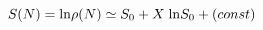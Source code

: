 \begin{equation}\label{s}
S(N) = {\rm ln} \rho(N) 
\simeq S_0 + X \; {\rm ln} S_0 + (const) 
\end{equation}

